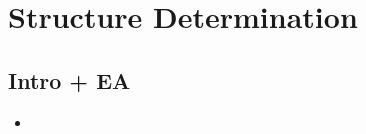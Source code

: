 \documentclass[../notes.tex]{subfiles}
\begin{document}
\chapter{Structure Determination}
\section{Intro + EA}
\begin{itemize}
    \item {}
\end{itemize}
\end{document}
